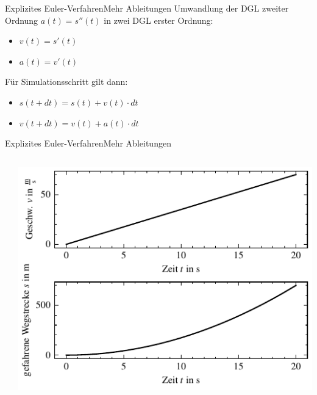 \documentclass[xelatex,aspectratio=169]{beamer}
\begin{document}
\begin{frame}{Explizites Euler-Verfahren}{Mehr Ableitungen}
    Umwandlung der DGL zweiter Ordnung $a(t) = s''(t)$ in zwei DGL erster Ordnung:
    \begin{itemize}
        \item $v(t) = s'(t)$
        \item $a(t) = v'(t)$
    \end{itemize}
    Für Simulationsschritt gilt dann:
    \begin{itemize}
        \item $s(t + dt) = s(t) + v(t) \cdot dt$
        \item $v(t + dt) = v(t) + a(t) \cdot dt$
    \end{itemize}
\end{frame}
\begin{frame}{Explizites Euler-Verfahren}{Mehr Ableitungen}
    \begin{columns}
        \begin{column}{0.5\textwidth}
            \inputminted[firstline=10, lastline=22]{python}{src/sim_growth_2nd.py}
        \end{column}
        \begin{column}{0.5\textwidth}
            \includegraphics[width=\textwidth]{fig/sim_growth_2nd.pdf}
        \end{column}
    \end{columns}
\end{frame}
\end{document}
